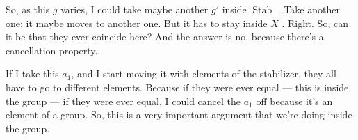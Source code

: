 \begin{proofWrapper}
\begin{speech}[00:08:10 - 00:10:04]
So, as this $g$ varies, I could take maybe another $g'$ inside $\operatorname{Stab}$ . Take another one: it maybe moves to another one. But it has to stay inside $X$ . Right. So, can it be that they ever coincide here? And the answer is no, because there's a cancellation property.

If I take this $a_1$, and I start moving it with elements of the stabilizer, they all have to go to different elements. Because if they were ever equal --- this is inside the group --- if they were ever equal, I could cancel the $a_1$ off because it's an element of a group. So, this is a very important argument that we're doing inside the group.
\end{speech}


\end{proofWrapper}
